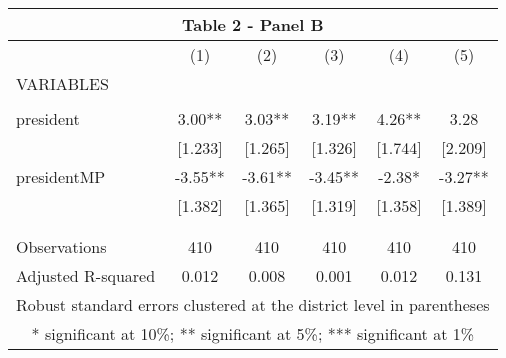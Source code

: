 \begin{tabular}{lccccc}
\multicolumn{6}{c}{Table 2 - Panel B} \\ \hline
 & (1) & (2) & (3) & (4) & (5) \\
VARIABLES &  &  &  &  &  \\ \hline
 &  &  &  &  &  \\
president & 3.00** & 3.03** & 3.19** & 4.26** & 3.28 \\
 & [1.233] & [1.265] & [1.326] & [1.744] & [2.209] \\
presidentMP & -3.55** & -3.61** & -3.45** & -2.38* & -3.27** \\
 & [1.382] & [1.365] & [1.319] & [1.358] & [1.389] \\
 &  &  &  &  &  \\
 &  &  &  &  &  \\
Observations & 410 & 410 & 410 & 410 & 410 \\
 Adjusted R-squared & 0.012 & 0.008 & 0.001 & 0.012 & 0.131 \\ \hline
\multicolumn{6}{c}{ Robust standard errors clustered at the district level in parentheses} \\
\multicolumn{6}{c}{ * significant at 10\%; ** significant at 5\%; *** significant at 1\%} \\
\end{tabular}
